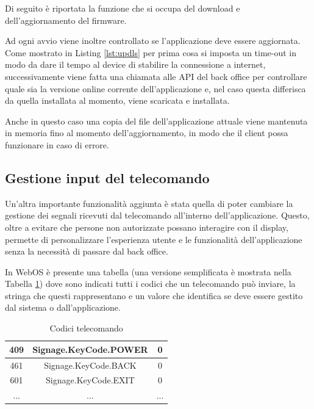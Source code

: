 Di seguito è riportata la funzione che si occupa del download e dell'aggiornamento del firmware.



Ad ogni avvio viene inoltre controllato se l'applicazione deve essere aggiornata.
Come mostrato in Listing \ref*{lst:updls} per prima cosa si imposta un time-out in modo da dare il tempo al device di stabilire la connessione a internet, successivamente viene fatta una chiamata alle API del back office per controllare quale sia la versione online corrente dell'applicazione e, nel caso questa differisca da quella installata al momento, viene scaricata e installata.



Anche in questo caso una copia del file dell'applicazione attuale viene mantenuta in memoria fino al momento dell'aggiornamento, in modo che il client possa funzionare in caso di errore.

\subsection{Gestione input del telecomando}

Un'altra importante funzionalità aggiunta è stata quella di poter cambiare la gestione dei segnali ricevuti dal telecomando all'interno dell'applicazione.
Questo, oltre a evitare che persone non autorizzate possano interagire con il display, permette di personalizzare l'esperienza utente e le funzionalità dell'applicazione senza la necessità di passare dal back office.

In WebOS è presente una tabella (una versione semplificata è mostrata nella Tabella \ref*{tab:keycode}) dove sono indicati tutti i codici che un telecomando può inviare, la stringa che questi rappresentano e un valore che identifica se deve essere gestito dal sistema o dall'applicazione.

\begin{table}
    \centering
    \begin{tabular}{ |c|c|c| } 
         \hline
         409 & Signage.KeyCode.POWER & 0 \\  
         \hline
         461 & Signage.KeyCode.BACK & 0 \\  
         \hline
         601 & Signage.KeyCode.EXIT & 0 \\  
         \hline
         ... & ... & ...\\
         \hline
    \end{tabular}
    \caption{Codici telecomando} \label{tab:keycode}
\end{table}
    
